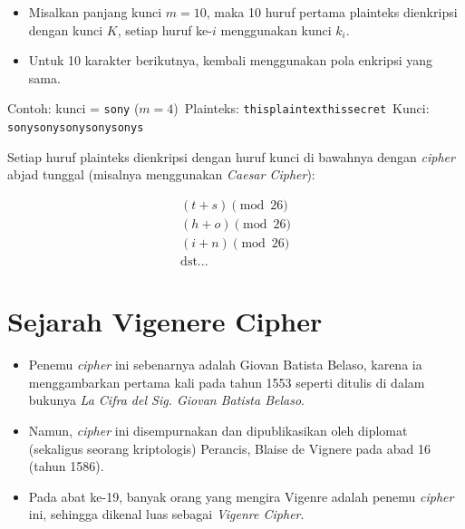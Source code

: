 \documentclass{article}
\begin{document}
\newpage


\begin{itemize}
    \item Misalkan panjang kunci $m = 10$, maka 10 huruf pertama plainteks dienkripsi dengan kunci $K$, setiap huruf ke-$i$ menggunakan kunci $k_i$.
    \item Untuk 10 karakter berikutnya, kembali menggunakan pola enkripsi yang sama.
\end{itemize}

\noindent Contoh: kunci = \texttt{sony} \quad ($m = 4$)\
Plainteks: \texttt{thisplaintexthissecret}\
Kunci: \texttt{sonysonysonysonysonys}

\vspace{5mm}

Setiap huruf plainteks dienkripsi dengan huruf kunci di bawahnya dengan \textit{cipher} abjad tunggal (misalnya menggunakan \textit{Caesar Cipher}):

\begin{align*}
    (t+s) \pmod{26} \\
    (h + o) \pmod{26} \\
    (i + n) \pmod{26} \\
    \text{dst...}
\end{align*}

\newpage


\vspace{95.04mm}

\section*{Sejarah Vigenere Cipher}

\begin{itemize}
    \item Penemu \textit{cipher} ini sebenarnya adalah Giovan Batista Belaso, karena ia menggambarkan pertama kali pada tahun 1553 seperti ditulis di dalam bukunya \textit{La Cifra del Sig. Giovan Batista Belaso}.
    \item Namun, \textit{cipher} ini disempurnakan dan dipublikasikan oleh diplomat (sekaligus seorang kriptologis) Perancis, Blaise de Vignere pada abad 16 (tahun 1586).
    \item Pada abat ke-19, banyak orang yang mengira Vigen\grave{e}re adalah penemu \textit{cipher} ini, sehingga dikenal luas sebagai \textit{Vigen\grave{e}re Cipher}.
\end{itemize}
\end{document}
